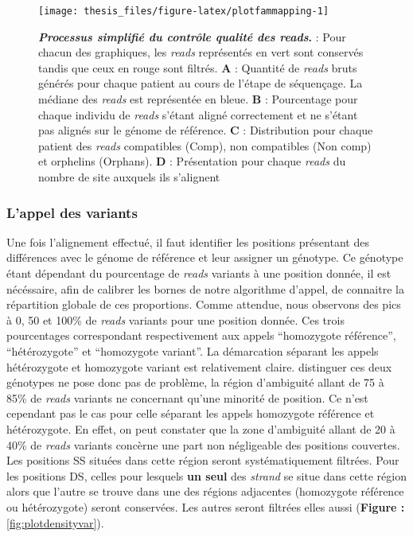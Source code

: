\documentclass[12pt,twoside]{ugathesis}
\begin{document}
\begin{figure}

{\centering \texttt{[image: thesis\_files/figure-latex/plotfammapping-1]} 

}

\caption[Processus simplifié du contrôle qualité des *reads*]{\textbf{\emph{Processus simplifié du contrôle
qualité des \emph{reads}}.} : Pour chacun des graphiques, les
\emph{reads} représentés en vert sont conservés tandis que ceux en rouge
sont filtrés. \textbf{A} : Quantité de \emph{reads} bruts générés pour
chaque patient au cours de l'étape de séquençage. La médiane des
\emph{reads} est représentée en bleue. \textbf{B} : Pourcentage pour
chaque individu de \emph{reads} s'étant aligné correctement et ne
s'étant pas alignés sur le génome de référence. \textbf{C} :
Distribution pour chaque patient des \emph{reads} compatibles (Comp),
non compatibles (Non comp) et orphelins (Orphans). \textbf{D} :
Présentation pour chaque \emph{reads} du nombre de site auxquels ils
s'alignent}\label{fig:plotfammapping}
\end{figure}














\newpage

\subsubsection{L'appel des variants}\label{lappel-des-variants-1}

Une fois l'alignement effectué, il faut identifier les positions
présentant des différences avec le génome de référence et leur assigner
un génotype. Ce génotype étant dépendant du pourcentage de \emph{reads}
variants à une position donnée, il est nécéssaire, afin de calibrer les
bornes de notre algorithme d'appel, de connaitre la répartition globale
de ces proportions. Comme attendue, nous observons des pics à 0, 50 et
100\% de \emph{reads} variants pour une position donnée. Ces trois
pourcentages correspondant respectivement aux appels ``homozygote
référence'', ``hétérozygote'' et ``homozygote variant''. La démarcation
séparant les appels hétérozygote et homozygote variant est relativement
claire. distinguer ces deux génotypes ne pose donc pas de problème, la
région d'ambiguité allant de 75 à 85\% de \emph{reads} variants ne
concernant qu'une minorité de position. Ce n'est cependant pas le cas
pour celle séparant les appels homozygote référence et hétérozygote. En
effet, on peut constater que la zone d'ambiguité allant de 20 à 40\% de
\emph{reads} variants concèrne une part non négligeable des positions
couvertes. Les positions SS situées dans cette région seront
systématiquement filtrées. Pour les positions DS, celles pour lesquels
\textbf{un seul} des \emph{strand} se situe dans cette région alors que
l'autre se trouve dans une des régions adjacentes (homozygote référence
ou hétérozygote) seront conservées. Les autres seront filtrées elles
aussi (\textbf{Figure : }\ref{fig:plotdensityvar}).
\end{document}
